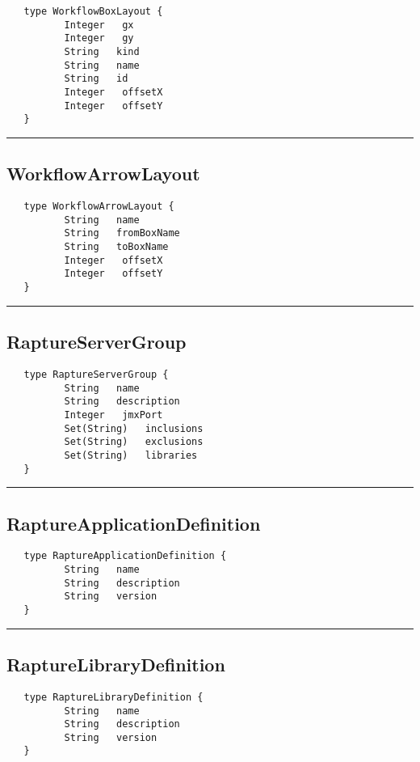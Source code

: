 \begin{verbatim}
   type WorkflowBoxLayout {
          Integer   gx
          Integer   gy
          String   kind
          String   name
          String   id
          Integer   offsetX
          Integer   offsetY
   }
\end{verbatim}

\rule{15cm}{2pt}
\subsection{WorkflowArrowLayout}
\label{type:WorkflowArrowLayout}

\begin{verbatim}
   type WorkflowArrowLayout {
          String   name
          String   fromBoxName
          String   toBoxName
          Integer   offsetX
          Integer   offsetY
   }
\end{verbatim}

\rule{15cm}{2pt}
\subsection{RaptureServerGroup}
\label{type:RaptureServerGroup}

\begin{verbatim}
   type RaptureServerGroup {
          String   name
          String   description
          Integer   jmxPort
          Set(String)   inclusions
          Set(String)   exclusions
          Set(String)   libraries
   }
\end{verbatim}

\rule{15cm}{2pt}
\subsection{RaptureApplicationDefinition}
\label{type:RaptureApplicationDefinition}

\begin{verbatim}
   type RaptureApplicationDefinition {
          String   name
          String   description
          String   version
   }
\end{verbatim}

\rule{15cm}{2pt}
\subsection{RaptureLibraryDefinition}
\label{type:RaptureLibraryDefinition}

\begin{verbatim}
   type RaptureLibraryDefinition {
          String   name
          String   description
          String   version
   }
\end{verbatim}

